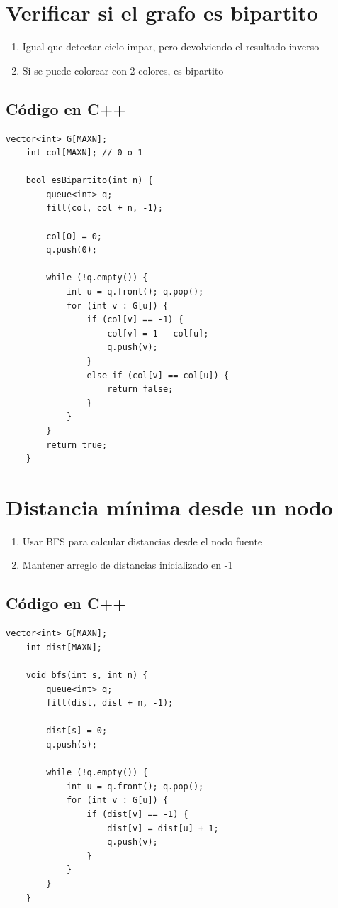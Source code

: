 \section{Verificar si el grafo es bipartito}

\begin{enumerate}
	\item Igual que detectar ciclo impar, pero devolviendo el resultado inverso
	\item Si se puede colorear con 2 colores, es bipartito
\end{enumerate}

\subsection*{Código en C++}

\begin{lstlisting}[caption=Verificar si grafo es bipartito]
	vector<int> G[MAXN];
	int col[MAXN]; // 0 o 1
	
	bool esBipartito(int n) {
		queue<int> q;
		fill(col, col + n, -1);
		
		col[0] = 0;
		q.push(0);
		
		while (!q.empty()) {
			int u = q.front(); q.pop();
			for (int v : G[u]) {
				if (col[v] == -1) {
					col[v] = 1 - col[u];
					q.push(v);
				}
				else if (col[v] == col[u]) {
					return false;
				}
			}
		}
		return true;
	}
\end{lstlisting}

\section{Distancia mínima desde un nodo}

\begin{enumerate}
	\item Usar BFS para calcular distancias desde el nodo fuente
	\item Mantener arreglo de distancias inicializado en -1
\end{enumerate}

\subsection*{Código en C++}

\begin{lstlisting}[caption=Distancia mínima con BFS]
	vector<int> G[MAXN];
	int dist[MAXN];
	
	void bfs(int s, int n) {
		queue<int> q;
		fill(dist, dist + n, -1);
		
		dist[s] = 0;
		q.push(s);
		
		while (!q.empty()) {
			int u = q.front(); q.pop();
			for (int v : G[u]) {
				if (dist[v] == -1) {
					dist[v] = dist[u] + 1;
					q.push(v);
				}
			}
		}
	}
\end{lstlisting}

